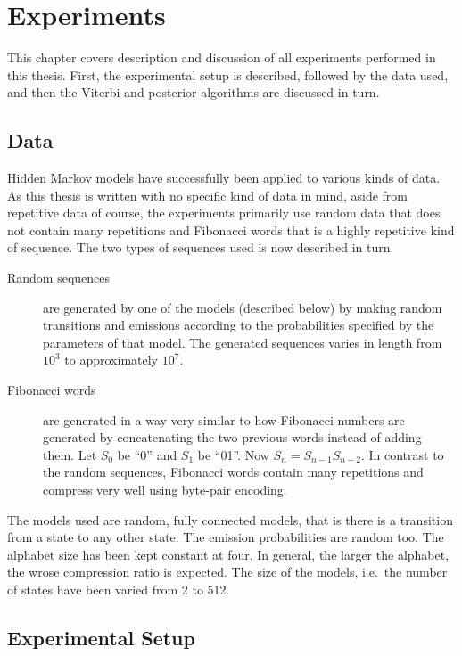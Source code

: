 \chapter{Experiments}

This chapter covers description and discussion of all experiments performed in
this thesis. First, the experimental setup is described, followed by the data
used, and then the Viterbi and posterior algorithms are discussed in turn.

\section{Data}

Hidden Markov models have successfully been applied to various kinds of
data.  As this thesis is written with no specific kind of
data in mind, aside from repetitive data of course, the experiments primarily
use random data that does not contain many repetitions and Fibonacci words that
is a highly repetitive kind of sequence. The two types of sequences used is now
described in turn.

\begin{description}
\item[Random sequences] are generated by one of the models (described below) by
  making random transitions and emissions according to the probabilities
  specified by the parameters of that model. The generated sequences varies in
  length from $10^3$ to approximately $10^7$.
\item[Fibonacci words] are generated in a way very similar to how Fibonacci
  numbers are generated by concatenating the two previous words instead of
  adding them. Let $S_0$ be ``0'' and $S_1$ be ``01''. Now
  $S_n=S_{n-1}S_{n-2}$. In contrast to the random sequences, Fibonacci words
  contain many repetitions and compress very well using byte-pair
  encoding. 
\end{description}

The models used are random, fully connected models, that is there is a
transition from a state to any other state. The emission probabilities are
random too. The alphabet size has been kept constant at four. In general, the
larger the alphabet, the wrose compression ratio is expected. The size of the
models, i.e.\ the number of states have been varied from 2 to 512.

\section{Experimental Setup}

